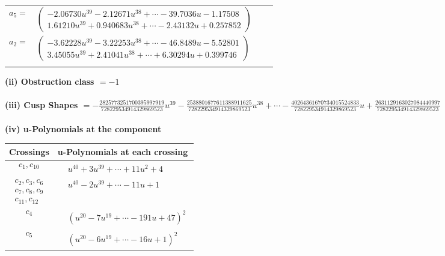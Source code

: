 \documentclass[1p]{elsarticle_modified}
\theoremstyle{definition}
\begin{document}
\begin{tabular}{m{7pt} m{180pt} m{7pt} m{180pt} }
\flushright $a_{5}=$&$\begin{pmatrix}-2.06730 u^{39}-2.12671 u^{38}+\cdots-39.7036 u-1.17508\\1.61210 u^{39}+0.940683 u^{38}+\cdots-2.43132 u+0.257852\end{pmatrix}$ \\
\flushright $a_{2}=$&$\begin{pmatrix}-3.62228 u^{39}-3.22253 u^{38}+\cdots-46.8489 u-5.52801\\3.45055 u^{39}+2.41041 u^{38}+\cdots+6.30294 u+0.399746\end{pmatrix}$\\&\end{tabular}
\flushleft \textbf{(ii) Obstruction class $= -1$}\\~\\
\flushleft \textbf{(iii) Cusp Shapes $= -\frac{2825773251700395997919}{728229534914329869523} u^{39}-\frac{2538801677611388911625}{728229534914329869523} u^{38}+\cdots-\frac{40264361670734015524833}{728229534914329869523} u+\frac{2631129163027084440997}{728229534914329869523}$}\\~\\
\newpage\renewcommand{\arraystretch}{1}
\flushleft \textbf{(iv) u-Polynomials at the component}\newline \\
\begin{tabular}{m{50pt}|m{274pt}}
Crossings & \hspace{64pt}u-Polynomials at each crossing \\
\hline $$\begin{aligned}c_{1},c_{10}\end{aligned}$$&$\begin{aligned}
&u^{40}+3 u^{39}+\cdots+11 u^2+4
\end{aligned}$\\
\hline $$\begin{aligned}c_{2},c_{3},c_{6}\\c_{7},c_{8},c_{9}\\c_{11},c_{12}\end{aligned}$$&$\begin{aligned}
&u^{40}-2 u^{39}+\cdots-11 u+1
\end{aligned}$\\
\hline $$\begin{aligned}c_{4}\end{aligned}$$&$\begin{aligned}
&(u^{20}-7 u^{19}+\cdots-191 u+47)^{2}
\end{aligned}$\\
\hline $$\begin{aligned}c_{5}\end{aligned}$$&$\begin{aligned}
&(u^{20}-6 u^{19}+\cdots-16 u+1)^{2}
\end{aligned}$\\
\hline
\end{tabular}\\~\\
\end{document}
